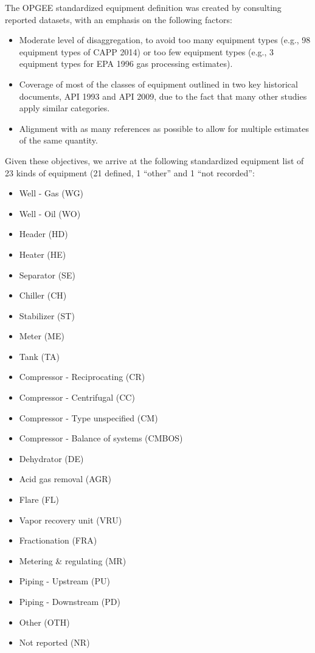 \documentclass[11pt]{report}
\begin{document}
The OPGEE standardized equipment definition was created by consulting reported datasets, with an emphasis on the following factors:
\begin{itemize}
\item Moderate level of disaggregation, to avoid too many equipment types (e.g., 98 equipment types of CAPP 2014) or too few equipment types (e.g., 3 equipment types for EPA 1996 gas processing estimates).
\item Coverage of most of the classes of equipment outlined in two key historical documents, API 1993 and API 2009, due to the fact that many other studies apply similar categories.
\item Alignment with as many references as possible to allow for multiple estimates of the same quantity. 
\end{itemize}
Given these objectives, we arrive at the following standardized equipment list of 23 kinds of equipment (21 defined, 1 ``other'' and 1 ``not recorded'':
\begin{itemize}
\item Well - Gas (WG)
\item Well - Oil	(WO)
\item Header	(HD)
\item Heater	(HE)
\item Separator	(SE)
\item Chiller	(CH)
\item Stabilizer	(ST)
\item Meter	(ME)
\item Tank		(TA)
\item Compressor - Reciprocating	(CR)
\item Compressor - Centrifugal	(CC)
\item Compressor - Type unspecified	 (CM)
\item Compressor - Balance of systems (CMBOS)
\item Dehydrator	(DE)
\item Acid gas removal	(AGR)
\item Flare	(FL)
\item Vapor recovery unit	(VRU)
\item Fractionation	(FRA)
\item Metering \& regulating	(MR)
\item Piping - Upstream	(PU)
\item Piping - Downstream	(PD)
\item Other	(OTH)
\item Not reported	(NR)
\end{itemize}
\end{document}
